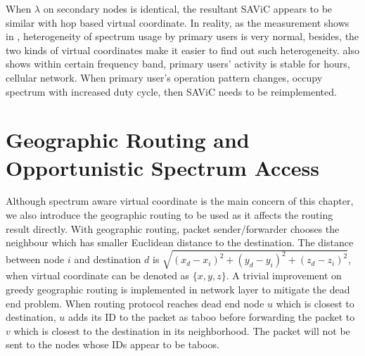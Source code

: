  

When $\lambda$ on secondary nodes is identical, the resultant SAViC appears to be similar with hop based virtual coordinate.
In reality, as the measurement shows in \cite{measurement_Palaios14}, heterogeneity of spectrum usage by primary users is very normal, besides, the two kinds of virtual coordinates make it easier to find out such heterogeneity.
\cite{measurement_Palaios14} also shows within certain frequency band, primary users' activity is stable for hours, \eg cellular network.
When primary user's operation pattern changes, \eg occupy spectrum with increased duty cycle, then SAViC needs to be reimplemented.

\section{Geographic Routing and Opportunistic Spectrum Access}
\label{osa}
Although spectrum aware virtual coordinate is the main concern of this chapter, we also introduce the geographic routing to be used as it affects the routing result directly.
With geographic routing, packet sender/forwarder chooses the neighbour which has smaller Euclidean distance to the destination.
The distance between node $i$ and destination $d$ is $\sqrt{(x_d-x_i)^2+(y_d-y_i)^2+(z_d-z_i)^2}$, when virtual coordinate can be denoted as $\{x, y, z\}$.
A trivial improvement on greedy geographic routing is implemented in network layer to mitigate the dead end problem.
When routing protocol reaches dead end node $u$ which is closest to destination, $u$ adds its ID to the packet as taboo before forwarding the packet to $v$ which is closest to the destination in its neighborhood.
The packet will not be sent to the nodes whose IDs appear to be taboos.

